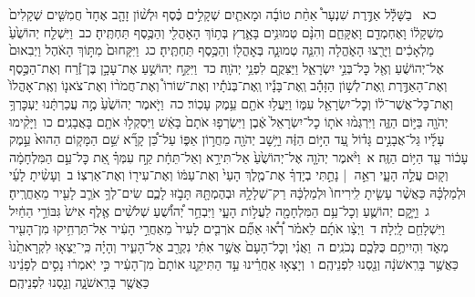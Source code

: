\documentclass[18pt]{article}
\newcommand{\kri}[1]{\Afootnote{#1}}	%
\begin{document}
 {\loc כא~}\edtext{(ואראה)}{\kri{קרי: וָאֵ֣רֶא}}  בַשָּׁלָ֡ל אַדֶּ֣רֶת שִׁנְעָר֩ אַחַ֨ת טוֹבָ֜ה וּמָאתַ֧יִם שְׁקָלִ֣ים כֶּ֗סֶף וּלְשׁ֨וֹן זָהָ֤ב אֶחָד֙ חֲמִשִּׁ֤ים שְׁקָלִים֙ מִשְׁקָל֔וֹ וָאֶחְמְדֵ֖ם וָאֶקָּחֵ֑ם וְהִנָּ֨ם טְמוּנִ֥ים בָּאָ֛רֶץ בְּת֥וֹךְ  הָאׇהֳלִ֖י  וְהַכֶּ֥סֶף תַּחְתֶּֽיהָ׃ \startlock
 {\loc כב~}וַיִּשְׁלַ֤ח יְהוֹשֻׁ֙עַ֙ מַלְאָכִ֔ים וַיָּרֻ֖צוּ הָאֹ֑הֱלָה וְהִנֵּ֧ה טְמוּנָ֛ה  בְּאׇהֳל֖וֹ  וְהַכֶּ֥סֶף תַּחְתֶּֽיהָ׃ \startlock
 {\loc כג~}וַיִּקָּחוּם֙ מִתּ֣וֹךְ הָאֹ֔הֶל וַיְבִאוּם֙ אֶל־יְהוֹשֻׁ֔עַ וְאֶ֖ל כׇּל־בְּנֵ֣י יִשְׂרָאֵ֑ל וַיַּצִּקֻ֖ם לִפְנֵ֥י יְהֹוָֽה׃ \startlock
 {\loc כד~}וַיִּקַּ֣ח יְהוֹשֻׁ֣עַ אֶת־עָכָ֣ן בֶּן־זֶ֡רַח וְאֶת־הַכֶּ֣סֶף וְאֶת־הָאַדֶּ֣רֶת וְֽאֶת־לְשׁ֣וֹן הַזָּהָ֡ב וְֽאֶת־בָּנָ֡יו וְֽאֶת־בְּנֹתָ֡יו וְאֶת־שׁוֹרוֹ֩ וְאֶת־חֲמֹר֨וֹ וְאֶת־צֹאנ֤וֹ  וְאֶֽת־אׇהֳלוֹ֙  וְאֶת־כׇּל־אֲשֶׁר־ל֔וֹ וְכׇל־יִשְׂרָאֵ֖ל עִמּ֑וֹ וַיַּעֲל֥וּ אֹתָ֖ם עֵ֥מֶק עָכֽוֹר׃ \startlock
 {\loc כה~}וַיֹּ֤אמֶר יְהוֹשֻׁ֙עַ֙ מֶ֣ה עֲכַרְתָּ֔נוּ יַעְכׇּרְךָ֥ יְהֹוָ֖ה בַּיּ֣וֹם הַזֶּ֑ה וַיִּרְגְּמ֨וּ אֹת֤וֹ כׇל־יִשְׂרָאֵל֙ אֶ֔בֶן וַיִּשְׂרְפ֤וּ אֹתָם֙ בָּאֵ֔שׁ וַיִּסְקְל֥וּ אֹתָ֖ם בָּאֲבָנִֽים׃ \startlock
 {\loc כו~}וַיָּקִ֨ימוּ עָלָ֜יו גַּל־אֲבָנִ֣ים גָּד֗וֹל עַ֚ד הַיּ֣וֹם הַזֶּ֔ה וַיָּ֥שׇׁב יְהֹוָ֖ה מֵחֲר֣וֹן אַפּ֑וֹ עַל־כֵּ֠ן קָרָ֞א שֵׁ֣ם הַמָּק֤וֹם הַהוּא֙ עֵ֣מֶק עָכ֔וֹר עַ֖ד הַיּ֥וֹם הַזֶּֽה׃ 
\startlock
 {\loc א~}וַיֹּ֨אמֶר יְהֹוָ֤ה אֶל־יְהוֹשֻׁ֙עַ֙ אַל־תִּירָ֣א וְאַל־תֵּחָ֔ת קַ֣ח עִמְּךָ֗ אֵ֚ת כׇּל־עַ֣ם הַמִּלְחָמָ֔ה וְק֖וּם עֲלֵ֣ה הָעָ֑י רְאֵ֣ה  |  נָתַ֣תִּי בְיָדְךָ֗ אֶת־מֶ֤לֶךְ הָעַי֙ וְאֶת־עַמּ֔וֹ וְאֶת־עִיר֖וֹ וְאֶת־אַרְצֽוֹ׃ \startlock
 {\loc ב~}וְעָשִׂ֨יתָ לָעַ֜י וּלְמַלְכָּ֗הּ כַּאֲשֶׁ֨ר עָשִׂ֤יתָ לִֽירִיחוֹ֙ וּלְמַלְכָּ֔הּ רַק־שְׁלָלָ֥הּ וּבְהֶמְתָּ֖הּ תָּבֹ֣זּוּ לָכֶ֑ם שִׂים־לְךָ֥ אֹרֵ֛ב לָעִ֖יר מֵאַחֲרֶֽיהָ׃ \startlock
 {\loc ג~}וַיָּ֧קׇם יְהוֹשֻׁ֛עַ וְכׇל־עַ֥ם הַמִּלְחָמָ֖ה לַעֲל֣וֹת הָעָ֑י וַיִּבְחַ֣ר יְ֠הוֹשֻׁ֠עַ שְׁלֹשִׁ֨ים אֶ֤לֶף אִישׁ֙ גִּבּוֹרֵ֣י הַחַ֔יִל וַיִּשְׁלָחֵ֖ם לָֽיְלָה׃ \startlock
 {\loc ד~}וַיְצַ֨ו אֹתָ֜ם לֵאמֹ֗ר רְ֠א֠וּ אַתֶּ֞ם אֹרְבִ֤ים לָעִיר֙ מֵאַחֲרֵ֣י הָעִ֔יר אַל־תַּרְחִ֥יקוּ מִן־הָעִ֖יר מְאֹ֑ד וִהְיִיתֶ֥ם כֻּלְּכֶ֖ם נְכֹנִֽים׃ \startlock
 {\loc ה~}וַאֲנִ֗י וְכׇל־הָעָם֙ אֲשֶׁ֣ר אִתִּ֔י נִקְרַ֖ב אֶל־הָעִ֑יר וְהָיָ֗ה כִּֽי־יֵצְא֤וּ לִקְרָאתֵ֙נוּ֙ כַּאֲשֶׁ֣ר בָּרִֽאשֹׁנָ֔ה וְנַ֖סְנוּ לִפְנֵיהֶֽם׃ \startlock
 {\loc ו~}וְיָצְא֣וּ אַחֲרֵ֗ינוּ עַ֣ד הַתִּיקֵ֤נוּ אוֹתָם֙ מִן־הָעִ֔יר כִּ֣י יֹֽאמְר֔וּ נָסִ֣ים לְפָנֵ֔ינוּ כַּאֲשֶׁ֖ר בָּרִֽאשֹׁנָ֑ה וְנַ֖סְנוּ לִפְנֵיהֶֽם׃ \startlock
\end{document}
